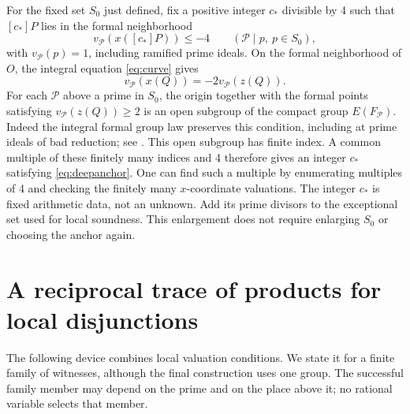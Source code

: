 \documentclass[11pt,reqno]{amsart}
\theoremstyle{definition}
\numberwithin{equation}{section}
\begin{document}
For the fixed set $S_0$ just defined, fix a positive integer $c_\ast$ divisible by 4 such that $[c_\ast]P$ lies in the formal neighborhood
\begin{equation}\label{eq:deepanchor}
 v_{\mathcal P}(x([c_\ast]P))\le-4
 \qquad({\mathcal P}\mid p,\ p\in S_0),
\end{equation}
with $v_{\mathcal P}(p)=1$, including ramified prime ideals. On the formal neighborhood of $O$, the integral equation \eqref{eq:curve} gives
\[
 v_{\mathcal P}(x(Q))=-2v_{\mathcal P}(z(Q)).
\]
For each $\mathcal P$ above a prime in $S_0$, the origin together with the formal points satisfying $v_{\mathcal P}(z(Q))\ge2$ is an open subgroup of the compact group $E(F_{\mathcal P})$. Indeed the integral formal group law preserves this condition, including at prime ideals of bad reduction; see \cite[Chapter IV]{Silv}. This open subgroup has finite index. A common multiple of these finitely many indices and 4 therefore gives an integer $c_\ast$ satisfying \eqref{eq:deepanchor}. One can find such a multiple by enumerating multiples of 4 and checking the finitely many $x$-coordinate valuations. The integer $c_\ast$ is fixed arithmetic data, not an unknown. Add its prime divisors to the exceptional set used for local soundness. This enlargement does not require enlarging $S_0$ or choosing the anchor again.


\section{A reciprocal trace of products for local disjunctions}\label{sec:local}

The following device combines local valuation conditions. We state it for a finite family of witnesses, although the final construction uses one group. The successful family member may depend on the prime and on the place above it; no rational variable selects that member.
\end{document}

